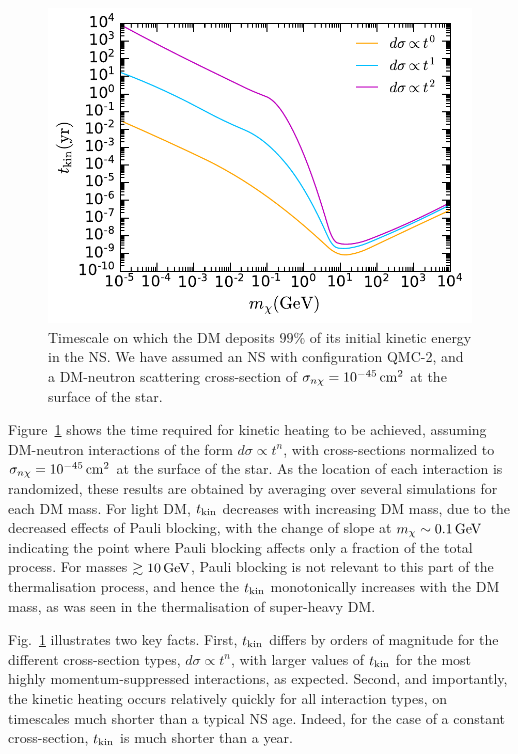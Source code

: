 \begin{figure}[t!bp]
    \centering  
    \includegraphics{kinheattime_mdm.pdf}
    \caption{Timescale on which the DM deposits $99\%$ of its initial kinetic energy in the NS. We have assumed an NS with configuration QMC-2, and a DM-neutron scattering cross-section of $\sigma_{n\chi}=10^{-45}{\rm \,cm}^2$ at the surface of the star. 
    }
    \label{ch6:fig:kinheattimes}
\end{figure}

Figure~\ref{ch6:fig:kinheattimes} shows the time required for kinetic heating to be achieved, assuming DM-neutron interactions of the form $d\sigma \propto t^n$, with cross-sections normalized to $\sigma_{n\chi} = 10^{-45}{\rm \,cm}^2$ at the surface of the star. As the location of each interaction is randomized, these results are obtained by averaging over several simulations for each DM mass. For light DM, $t_{\rm kin}$ decreases with increasing DM mass, due to the decreased effects of Pauli blocking, with the change of slope at $m_\chi \sim 0.1{\rm \,GeV}$ indicating the point where Pauli blocking affects only a fraction of the total process.
For masses $\gtrsim 10{\rm \,GeV}$, Pauli blocking is not relevant to this part of the thermalisation process, and hence the $t_{\rm kin}$ monotonically increases with the DM mass, as was seen in the thermalisation of super-heavy DM. 

Fig.~\ref{ch6:fig:kinheattimes} illustrates two key facts. First, $t_{\rm kin}$ differs by orders of magnitude for the different cross-section types, $d\sigma\propto t^n$, with larger values of $t_{\rm kin}$ for the most highly momentum-suppressed interactions, as expected. Second, and importantly, the kinetic heating occurs relatively quickly for all interaction types, on timescales much shorter than a typical NS age. Indeed, for the case of a constant cross-section, $t_{\rm kin}$ is much shorter than a year.



